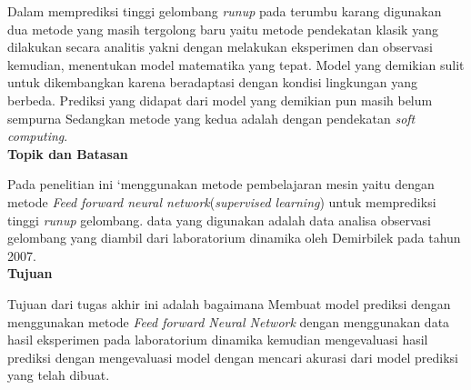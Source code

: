 Dalam memprediksi tinggi gelombang \emph{runup} pada terumbu karang digunakan dua metode yang masih tergolong baru yaitu metode pendekatan klasik yang dilakukan secara analitis yakni dengan melakukan eksperimen dan observasi kemudian, menentukan model matematika yang tepat. Model yang demikian sulit untuk dikembangkan karena beradaptasi dengan kondisi lingkungan yang berbeda. Prediksi yang didapat dari model yang demikian pun masih belum sempurna \cite{DemirbilekBoussinesq} Sedangkan metode yang kedua adalah dengan  pendekatan \emph{soft computing}.\\

{\textbf{Topik dan Batasan}}

Pada penelitian ini `menggunakan metode pembelajaran mesin yaitu dengan metode \emph{Feed forward neural network}(\emph{supervised learning}) untuk memprediksi tinggi \emph{runup} gelombang. data yang digunakan adalah data analisa observasi gelombang yang diambil dari laboratorium dinamika oleh Demirbilek pada tahun 2007\cite{DemirbilekReport}.\\

{\textbf{Tujuan}}

Tujuan dari tugas akhir ini adalah bagaimana Membuat model prediksi dengan menggunakan metode \emph{Feed forward Neural Network} dengan menggunakan data hasil eksperimen pada laboratorium  dinamika kemudian mengevaluasi hasil prediksi dengan mengevaluasi model dengan mencari  akurasi dari model prediksi yang telah dibuat.

